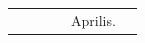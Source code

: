 \documentclass[11pt,openany]{book}
\renewcommand{\\}{\par\hspace*{1em}} %
\begin{document}
\begin{center}
\begin{tabular}{l | l | l | r | l l}
& & & & \color{Red} Aprilis. \\

\end{tabular}
\end{center}
\end{document}
